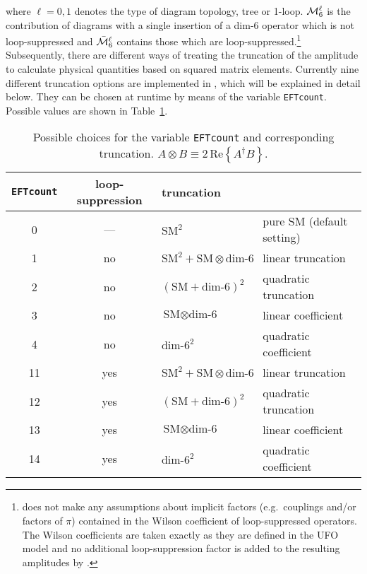 where $\ell=0,1$ denotes the type of diagram topology, tree or 1-loop. $\mathcal{M}^\ell_6$ is the contribution of diagrams with a single insertion of a dim-6 operator which is not loop-suppressed and $\bar{\mathcal{M}}^\ell_6$ contains those which are loop-suppressed.\footnote{\gosam does not make any assumptions about implicit factors (e.g.\ couplings and/or factors of $\pi$) contained in the Wilson coefficient of loop-suppressed operators. The Wilson coefficients are taken exactly as they are defined in the UFO model and no additional loop-suppression factor is added to the resulting amplitudes by \gosam.} Subsequently, there are different ways of treating the truncation of the amplitude to calculate physical quantities based on squared matrix elements. Currently nine different truncation options are implemented in \gosam, which will be explained in detail below. They can be chosen at runtime by means of the variable \texttt{EFTcount}. Possible values are shown in Table~\ref{tab:EFTcount}.

\begin{table}
\renewcommand{\arraystretch}{1.5}
\centering
\begin{tabular}{c|c|l|l}
   \texttt{EFTcount} & loop-suppression & truncation & \\
\hline
   0 & --- & $\text{SM}^2$ & pure SM (default setting)\\
\hline
   1 & no & $\text{SM}^2 + \text{SM}\otimes\text{dim-6}$ & linear truncation\\
   2 & no & $\left(\text{SM}+\text{dim-6}\right)^2$ & quadratic truncation\\
   3 & no & $\text{SM}\otimes\text{dim-6}$ & linear coefficient\\
   4 & no & $\text{dim-6}^2$ & quadratic coefficient\\
\hline
   11 & yes & $\text{SM}^2 + \text{SM}\otimes\text{dim-6}$ & linear truncation\\
   12 & yes & $\left(\text{SM}+\text{dim-6}\right)^2$ & quadratic truncation\\
   13 & yes & $\text{SM}\otimes\text{dim-6}$ & linear coefficient\\
   14 & yes & $\text{dim-6}^2$ & quadratic coefficient
\end{tabular}
\caption{Possible choices for the variable \texttt{EFTcount} and corresponding truncation. $A\otimes B\equiv2\,\mathrm{Re}\left\{A^\dagger B\right\}$.}
\label{tab:EFTcount}
\renewcommand{\arraystretch}{1.25}
\end{table}

